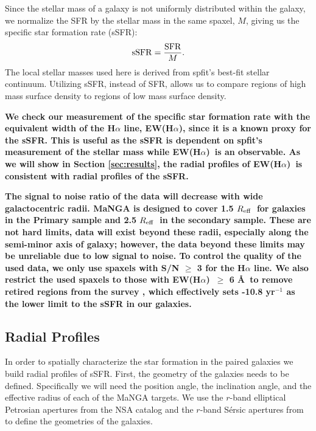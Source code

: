 \documentclass[iop,revtex4,twocolumn,apj,numberedappendix,appendixfloats]{emulateapj}
\newcommand{\reff}{$R_{\rm eff}$}
\newcommand{\ewha}{EW(H$\alpha$)}
\begin{document}
Since the stellar mass of a galaxy is not uniformly distributed within the galaxy, we normalize the SFR by the stellar mass in the same spaxel, $M$, giving us the specific star formation rate (sSFR):
\begin{equation}
{\rm sSFR} = \frac{\rm SFR}{M}.
\end{equation}
The local stellar masses used here is derived from {\sc spfit}'s best-fit stellar continuum. Utilizing sSFR, instead of SFR, allows us to compare regions of high mass surface density to regions of low mass surface density. 

\textbf{
We check our measurement of the specific star formation rate with the equivalent width of the H$\alpha$ line, \ewha, since it is a known proxy for the sSFR. This is useful as the sSFR is dependent on {\sc spfit}'s measurement of the stellar mass while \ewha\ is an observable. As we will show in Section \ref{sec:results}, the radial profiles of \ewha\ is consistent with radial profiles of the sSFR.
}

\textbf{
The signal to noise ratio of the data will decrease with wide galactocentric radii. MaNGA is designed to cover 1.5 \reff\ for galaxies in the Primary sample and 2.5 \reff\ in the secondary sample. These are not hard limits, data will exist beyond these radii, especially along the semi-minor axis of galaxy; however, the data beyond these limits may be unreliable due to low signal to noise. To control the quality of the used data, we only use spaxels with S/N $\ge$ 3 for the H$\alpha$ line. We also restrict the used spaxels to those with \ewha\ $\ge$ 6 \AA\ to remove retired regions from the survey \citep{Cid-Fernandes:2011}, which effectively sets -10.8 yr$^{-1}$ as the lower limit to the sSFR in our galaxies.
}

\subsection{Radial Profiles}\label{sec:radial}

In order to spatially characterize the star formation in the paired galaxies we build radial profiles of sSFR. First, the geometry of the galaxies needs to be defined. Specifically we will need the position angle, the inclination angle, and the effective radius of each of the MaNGA targets. We use the $r$-band elliptical Petrosian apertures from the NSA catalog and the $r$-band S\'ersic apertures from \citet{Simard:2011} to define the geometries of the galaxies. 
\end{document}
